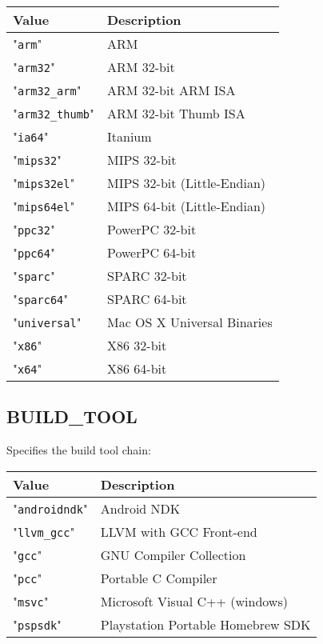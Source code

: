 \documentclass{article}
\newcommand{\val}[1]{"{\tt #1}"}
\begin{document}
\begin{tabular}{ll}
Value             & Description                 \\
\hline
\val{arm}         & ARM                         \\
\val{arm32}       & ARM 32-bit                  \\ 
\val{arm32\_arm}   & ARM 32-bit ARM ISA          \\
\val{arm32\_thumb} & ARM 32-bit Thumb ISA        \\
\val{ia64}        & Itanium                     \\
\val{mips32}      & MIPS 32-bit                 \\
\val{mips32el}    & MIPS 32-bit (Little-Endian) \\
\val{mips64el}    & MIPS 64-bit (Little-Endian) \\
\val{ppc32}       & PowerPC 32-bit              \\
\val{ppc64}       & PowerPC 64-bit              \\
\val{sparc}       & SPARC 32-bit                \\
\val{sparc64}     & SPARC 64-bit                \\
\val{universal}   & Mac OS X Universal Binaries \\
\val{x86}         & X86 32-bit                  \\
\val{x64}         & X86 64-bit                  \\
\end{tabular}

\subsection{BUILD\_TOOL}

Specifies the build tool chain:

\begin{tabular}{ll}
Value            & Description                       \\
\hline
\val{androidndk} & Android NDK                       \\ 
\val{llvm\_gcc}  & LLVM with GCC Front-end           \\
\val{gcc}        & GNU Compiler Collection           \\
\val{pcc}        & Portable C Compiler               \\ 
\val{msvc}       & Microsoft Visual C++ (windows)    \\
\val{pspsdk}     & Playstation Portable Homebrew SDK \\
\end{tabular}
\end{document}
